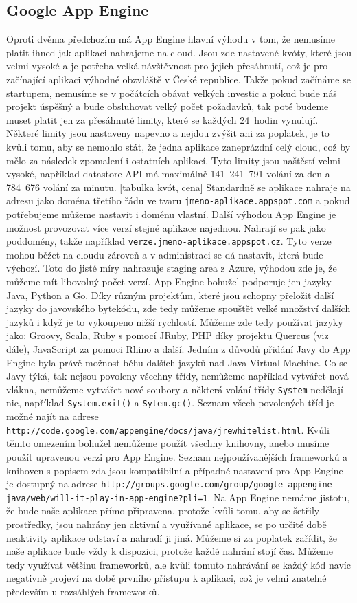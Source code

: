 \subsection{Google App Engine}
Oproti dvěma předchozím má App Engine hlavní výhodu v tom, že nemusíme platit ihned jak aplikaci nahrajeme na cloud. Jsou zde nastavené kvóty, které jsou velmi vysoké a je potřeba velká návštěvnost pro jejich přesáhnutí, což je pro začínající aplikaci výhodné obzvláště v České republice. Takže pokud začínáme se startupem, nemusíme se v počátcích obávat velkých investic a pokud bude náš projekt úspěšný a bude obsluhovat velký počet požadavků, tak poté budeme muset platit jen za přesáhnuté limity, které se každých 24~hodin vynulují. Některé limity jsou nastaveny napevno a nejdou zvýšit ani za poplatek, je to kvůli tomu, aby se nemohlo stát, že jedna aplikace zaneprázdní celý cloud, což by mělo za následek zpomalení i ostatních aplikací. Tyto limity jsou naštěstí velmi vysoké, například datastore API má maximálně 141~241~791 volání za den a 784~676 volání za minutu. 
[tabulka kvót, cena]
Standardně se aplikace nahraje na adresu jako doména třetího řádu ve
tvaru \verb|jmeno-aplikace.appspot.com| a pokud potřebujeme můžeme nastavit i doménu vlastní. Další výhodou App Engine je možnost provozovat více verzí stejné aplikace najednou. Nahrají se pak jako poddomény, takže například \verb|verze.jmeno-aplikace.appspot.cz|. Tyto verze mohou běžet na cloudu zároveň a v administraci se dá nastavit, která bude výchozí. Toto do jisté míry nahrazuje staging area z Azure, výhodou zde je, že můžeme mít libovolný počet verzí. App Engine bohužel podporuje jen jazyky Java, Python a Go. Díky různým projektům, které jsou schopny přeložit další jazyky do javovského bytekódu, zde tedy můžeme spouštět velké množství dalších jazyků i když je to vykoupeno nižší rychlostí. Můžeme zde tedy používat jazyky jako: Groovy, Scala, Ruby s pomocí JRuby, PHP díky projektu Quercus (viz dále), JavaScript za pomoci Rhino a další. Jedním z důvodů přidání Javy do App Engine byla právě možnost běhu dalších jazyků nad Java Virtual Machine. Co se Javy týká, tak nejsou povoleny všechny třídy, nemůžeme například vytvářet nová vlákna, nemůžeme vytvářet nové soubory a některá volání třídy \verb|System| nedělají nic, například \verb|System.exit()| a \verb|Sytem.gc()|. Seznam všech povolených tříd je možné najít na adrese \verb|http://code.google.com/appengine/docs/java/jrewhitelist.html|. Kvůli těmto omezením bohužel nemůžeme použít všechny knihovny, anebo musíme použít upravenou verzi pro App Engine. Seznam nejpoužívanějších frameworků a knihoven s popisem zda jsou kompatibilní a případné nastavení pro App Engine je dostupný na adrese \verb|http://groups.google.com/group/google-appengine-java/web/will-it-play-in-app-engine?pli=1|. Na App Engine nemáme jistotu, že bude naše aplikace přímo připravena, protože kvůli tomu, aby se šetřily prostředky, jsou nahrány jen aktivní a využívané aplikace, se po určité době neaktivity aplikace odstaví a nahradí ji jiná. Můžeme si za poplatek zařídit, že naše aplikace bude vždy k dispozici, protože každé nahrání stojí čas. Můžeme tedy využívat většinu frameworků, ale kvůli tomuto nahrávání se každý kód navíc negativně projeví na době prvního přístupu k aplikaci, což je velmi znatelné především u rozsáhlých frameworků.

